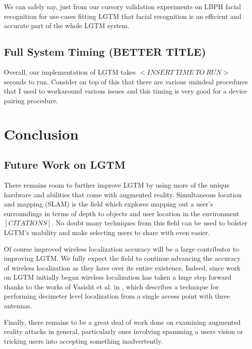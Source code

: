 \documentclass[12pt]{report}
\begin{document}
We can safely say, just from our cursory validation experiments on LBPH facial recognition for use-cases fitting LGTM that facial recognition is an efficient and accurate part of the whole LGTM system. \par

\section{Full System Timing (BETTER TITLE)}
Overall, our implementation of LGTM takes $<INSERT \: TIME \: TO \: RUN>$ seconds to run. Consider on top of this that there are various unindeal procedures that I used to workaround various issues and this timing is very good for a device pairing procedure. \par

\chapter{Conclusion}
\section{Future Work on LGTM}
There remains room to further improve LGTM by using more of the unique hardware and abilities that come with augmented reality. Simultaneous location and mapping (SLAM) is the field which explores mapping out a user's surroundings in terms of depth to objects and user location in the environment $[CITATIONS]$. No doubt many techniques from this field can be used to bolster LGTM's usability and make selecting users to share with even easier. \par

Of course improved wireless localization accuracy will be a large contributor to improving LGTM. We fully expect the field to continue advancing the accuracy of wireless localization as they have over its entire existence. Indeed, since work on LGTM initially began wireless localization has taken a huge step forward thanks to the works of Vasisht et al. in \cite{ChronosSingleAPLocalizationVasisht2016}, which describes a technique for performing decimeter level localization from a single access point with three antennas. \par


Finally, there remains to be a great deal of work done on examining augmented reality attacks in general, particularly ones involving spamming a users vision or tricking users into accepting something inadvertently. \par
\end{document}
